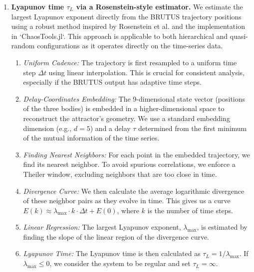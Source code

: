 \begin{enumerate}

    \item \textbf{Lyapunov time $\tau_L$ via a Rosenstein-style estimator.}
    \label{item:lyap}
    We estimate the largest Lyapunov exponent directly from the BRUTUS trajectory positions using a robust method inspired by Rosenstein et al. and the implementation in `ChaosTools.jl`. This approach is applicable to both hierarchical and quasi-random configurations as it operates directly on the time-series data.

    \begin{enumerate}
        \item \emph{Uniform Cadence:} The trajectory is first resampled to a uniform time step $\Delta t$ using linear interpolation. This is crucial for consistent analysis, especially if the BRUTUS output has adaptive time steps.

        \item \emph{Delay-Coordinates Embedding:} The 9-dimensional state vector (positions of the three bodies) is embedded in a higher-dimensional space to reconstruct the attractor's geometry. We use a standard embedding dimension (e.g., $d=5$) and a delay $\tau$ determined from the first minimum of the mutual information of the time series.

        \item \emph{Finding Nearest Neighbors:} For each point in the embedded trajectory, we find its nearest neighbor. To avoid spurious correlations, we enforce a Theiler window, excluding neighbors that are too close in time.

        \item \emph{Divergence Curve:} We then calculate the average logarithmic divergence of these neighbor pairs as they evolve in time. This gives us a curve $E(k) \approx \lambda_{\max} \cdot k \cdot \Delta t + E(0)$, where $k$ is the number of time steps.

        \item \emph{Linear Regression:} The largest Lyapunov exponent, $\lambda_{\max}$, is estimated by finding the slope of the linear region of the divergence curve.

        \item \emph{Lyapunov Time:} The Lyapunov time is then calculated as $\tau_L = 1/\lambda_{\max}$. If $\lambda_{\max} \le 0$, we consider the system to be regular and set $\tau_L = \infty$.
    \end{enumerate}


\end{enumerate}
